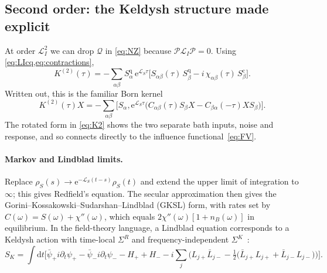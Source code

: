 \documentclass[11pt]{article}
\newcommand{\Lc}{\mathcal{L}}
\newcommand{\Pc}{\mathcal{P}}
\newcommand{\Qc}{\mathcal{Q}}
\newcommand{\ee}{\mathrm{e}}
\newcommand{\dd}{\mathrm{d}}
\newcommand{\cl}{\mathrm{c}}
\newcommand{\qu}{\mathrm{q}}
\begin{document}
\subsection{Second order: the Keldysh structure made explicit}
At order $\Lc_I^2$ we can drop $\Qc$ in \cref{eq:NZ} because $\Pc\Lc_I\Pc=0$. Using
\cref{eq:LIcq,eq:contractions},
\begin{equation}
  \boxed{\;K^{(2)}(\tau)=-\sum_{\alpha\beta}S^\qu_\alpha\,\ee^{\Lc_S\tau}
  \Big[S_{\alpha\beta}(\tau)\,S^\qu_\beta-i\,\chi_{\alpha\beta}(\tau)\,S^\cl_\beta\Big].\;}
  \label{eq:K2}
\end{equation}
Written out, this is the familiar Born kernel
\begin{equation}
K^{(2)}(\tau)X=-\sum_{\alpha\beta}\big[S_\alpha,\ee^{\Lc_S\tau}\big(C_{\alpha\beta}(\tau)S_\beta X-C_{\beta\alpha}(-\tau)XS_\beta\big)\big].
\end{equation}
The rotated form in \cref{eq:K2} shows the two separate bath inputs, noise and response,
and so connects directly to the influence functional~\eqref{eq:FV}.

\paragraph{Markov and Lindblad limits.}
Replace $\rho_S(s)\to\ee^{-\Lc_S(t-s)}\rho_S(t)$ and extend the upper limit of integration to
$\infty$; this gives Redfield's equation. The secular approximation then gives the
Gorini--Kossakowski--Sudarshan--Lindblad (GKSL) form, with rates set by
$C(\omega)=S(\omega)+\chi''(\omega)$, which equals $2\chi''(\omega)[1+n_B(\omega)]$ in equilibrium. In the field-theory
language, a Lindblad equation corresponds to a Keldysh action with time-local
$\Sigma^R$ and frequency-independent $\Sigma^K$~\cite{Sieberer2016}:
\begin{equation}
  S_K=\int\!\dd t\Big[\bar\psi_+ i\partial_t\psi_+-\bar\psi_- i\partial_t\psi_- -H_++H_-
  -i\sum_j\Big(L_{j+}\bar L_{j-}-\tfrac12\big(\bar L_{j+}L_{j+}+\bar L_{j-}L_{j-}\big)\Big)\Big].
\end{equation}
\end{document}
